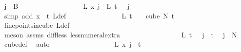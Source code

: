 \begin{isabellebody}
\ {\isachardoublequoteopen}j\ {\isasymin}\ B\ {}{\isachardoublequoteclose}\isanewline
\ \ \ \ \ \ \ \ \ \ \ \ \ \ \isamarkupfalse%
\ \isamarkupfalse%
\ {\isachardoublequoteopen}L{\isacharprime}{\kern0pt}\ x\ j\ {\isacharequal}{\kern0pt}\ L\ {\isacharparenleft}{\kern0pt}t\ {\isacharminus}{\kern0pt}\ {}{\isacharparenright}{\kern0pt}\ j{\isachardoublequoteclose}\ \isanewline
\ \ \ \ \ \ \ \ \ \ \ \ \ \ \ \ \isamarkupfalse%
\ {\isacharparenleft}{\kern0pt}simp\ add{\isacharcolon}{\kern0pt}\ {\isacartoucheopen}x\ {\isacharequal}{\kern0pt}\ t{\isacartoucheclose}\ L{\isacharprime}{\kern0pt}{\isacharunderscore}{\kern0pt}def{\isacharparenright}{\kern0pt}\isanewline
\ \ \ \ \ \ \ \ \ \ \ \ \ \ \isamarkupfalse%
\ {\isachardoublequoteopen}L\ {\isacharparenleft}{\kern0pt}t\ {\isacharminus}{\kern0pt}\ {}{\isacharparenright}{\kern0pt}\ {\isasymin}\ cube\ N{\isacharprime}{\kern0pt}\ t{\isachardoublequoteclose}\ \isamarkupfalse%
\ line{\isacharunderscore}{\kern0pt}points{\isacharunderscore}{\kern0pt}in{\isacharunderscore}{\kern0pt}cube\ L{\isacharunderscore}{\kern0pt}def\ \isanewline
\ \ \ \ \ \ \ \ \ \ \ \ \ \ \ \ \isamarkupfalse%
\ {\isacharparenleft}{\kern0pt}meson\ assms{\isacharparenleft}{\kern0pt}{}{\isacharparenright}{\kern0pt}\ diff{\isacharunderscore}{\kern0pt}less\ less{\isacharunderscore}{\kern0pt}numeral{\isacharunderscore}{\kern0pt}extra{\isacharparenleft}{\kern0pt}{}{\isacharparenright}{\kern0pt}{\isacharparenright}{\kern0pt}\isanewline
\ \ \ \ \ \ \ \ \ \ \ \ \ \ \isamarkupfalse%
\ \isamarkupfalse%
\ {\isachardoublequoteopen}L\ {\isacharparenleft}{\kern0pt}t\ {\isacharminus}{\kern0pt}\ {}{\isacharparenright}{\kern0pt}\ j\ {\isacharless}{\kern0pt}\ t{\isachardoublequoteclose}\ \isamarkupfalse%
\ {\isacartoucheopen}j\ {\isasymin}\ {\isacharbraceleft}{\kern0pt}{\isachardot}{\kern0pt}{\isachardot}{\kern0pt}{\isacharless}{\kern0pt}N{\isacharprime}{\kern0pt}{\isacharbraceright}{\kern0pt}{\isacartoucheclose}\ \isamarkupfalse%
\ cube{\isacharunderscore}{\kern0pt}def\ \isamarkupfalse%
\ auto\ \isanewline
\ \ \ \ \ \ \ \ \ \ \ \ \ \ \isamarkupfalse%
\ \isamarkupfalse%
\ {\isachardoublequoteopen}L{\isacharprime}{\kern0pt}\ x\ j\ {\isasymin}\ {\isacharbraceleft}{\kern0pt}{\isachardot}{\kern0pt}{\isachardot}{\kern0pt}{\isacharless}{\kern0pt}t\ {\isacharplus}{\kern0pt}\ {}{\isacharbraceright}{\kern0pt}{\isachardoublequoteclose}\ \isamarkupfalse%

\end{isabellebody}
